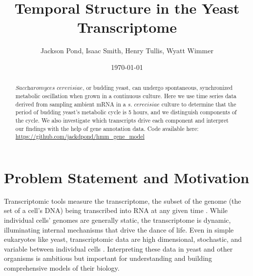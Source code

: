 \documentclass[11pt]{amsart}
\title{Temporal Structure in the Yeast Transcriptome}
\author{Jackson Pond, Isaac Smith, Henry Tullis, Wyatt Wimmer}
\date{\today} %
\begin{document}
\maketitle %

\begin{abstract}
$\textit{Saccharomyces cerevisiae}$, or budding yeast, can undergo spontaneous, synchronized metabolic oscillation when grown in a continuous culture. Here we use time series data derived from sampling ambient mRNA in a $\textit{s. cerecisiae}$ culture
to determine that the period of budding yeast's metabolic cycle is 5 hours, and we distinguish components of the cycle. We also investigate which transcripts drive each component and interpret our findings with the help of gene annotation data. Code available here: \url{https://github.com/jackdpond/hmm_gene_model}
\end{abstract}

\section{Problem Statement and Motivation}

Transcriptomic tools measure the transcriptome, the subset of the genome (the set of a cell's DNA) being transcribed into RNA at any given time \cite{caudai_ai_2021}. While individual cells' genomes are generally static, the transcriptome is dynamic, illuminating internal mechanisms that drive the dance of life. Even in simple eukaryotes like yeast, transcriptomic data are high dimensional, stochastic, and variable between individual cells \cite{nadal-ribelles_sensitive_2019}. Interpreting these data in yeast and other organisms is ambitious but important for understanding and building comprehensive models of their biology.
\end{document}
